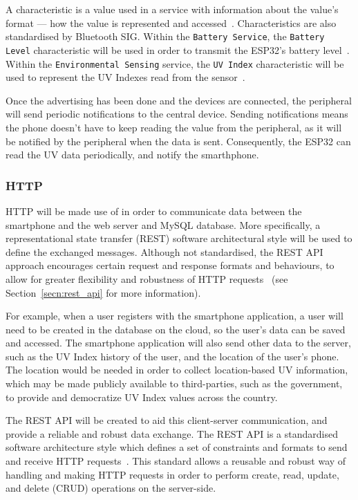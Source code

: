 \documentclass[12pt,openany,a4paper]{book}
\newcommand{\secn}[1] {Section~\ref{#1}}	%
\begin{document}
A characteristic is a value used in a
service with information about the value's format — how the value is
represented and accessed~\cite{martinbl}. Characteristics are also standardised by
Bluetooth SIG. Within the \verb|Battery Service|, the \verb|Battery Level| characteristic will
be used in order to transmit the ESP32's battery level~\cite{bluetooth_battery_service}. Within the
\verb|Environmental Sensing| service, the \verb|UV Index| characteristic will be used to
represent the UV Indexes read from the sensor~\cite{bluetooth_environmental_sensing}.

Once the advertising
has been done and the devices are connected, the peripheral will send periodic
notifications to the central device. Sending notifications means the phone
doesn't have to keep reading the value from the peripheral, as it will be
notified by the peripheral when the data is sent. Consequently, the ESP32 can read
the UV data periodically, and notify the smarthphone.

\subsubsection{HTTP}

HTTP will be made use of in order to communicate data between the smartphone and
the web server and MySQL database. More specifically, a representational
state transfer (REST) software architectural
style will be used to define the exchanged messages. Although not standardised, the
REST API approach encourages certain request and response formats and behaviours,
to allow for greater flexibility and robustness of HTTP requests~\cite{rest_api}
(see \secn{secn:rest_api} for more information).

For example, when a user registers with the
smartphone application, a user will need to be created in the database on the
cloud, so the user's data can be saved and accessed. The smartphone application
will also send other data to the server, such as the UV Index history of the
user, and the location of the user's phone. The location would be needed in
order to collect location-based UV information, which may be made publicly
available to third-parties, such as the government, to provide and democratize
UV Index values across the country.

The REST API will be created to aid this client-server
communication, and provide a reliable and robust data exchange. The REST API is
a standardised software architecture style which defines a set of constraints
and formats to send and receive HTTP requests~\cite{www_consortium}. This standard allows a
reusable and robust way of handling and making HTTP requests in order to perform
create, read, update, and delete (CRUD) operations on the server-side.
\end{document}
